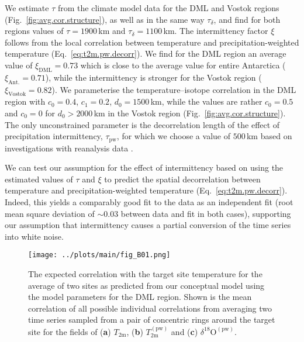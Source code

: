 \documentclass[cp, manuscript]{copernicus}
\begin{document}
We estimate $\tau$ from the climate model data for the DML and Vostok regions
(Fig.~\ref{fig:avg.cor.structure}), as well as in the same way
$\tau_{\delta}$, and find for both regions values of $\tau=1900$\,km and
$\tau_{\delta}=1100$\,km. The intermittency factor $\xi$ follows from the
local correlation between temperature and precipitation-weighted temperature
(Eq.~\ref{eq:t2m.pw.decorr}). We find for the DML region an average value of
$\xi_{\mathrm{DML}}=0.73$ which is close to the average value for entire
Antarctica ($\xi_{\mathrm{Ant.}}=0.71$), while the intermittency is stronger for
the Vostok region ($\xi_{\mathrm{Vostok}}=0.82$). We parameterise the
temperature--isotope correlation in the DML region with $c_0=0.4$, $c_1=0.2$,
$d_0=1500$\,km, while the values are rather $c_0=0.5$ and $c_0=0$ for
$d_0>2000$\,km in the Vostok region (Fig.~\ref{fig:avg.cor.structure}). The only
unconstrained parameter is the decorrelation length of the effect of
precipitation intermittency, $\tau_{\mathrm{pw}}$, for which we choose a value
of $500$\,km based on investigations with reanalysis data \citep{Munch2018a}.

We can test our assumption for the effect of intermittency based on using the
estimated values of $\tau$ and $\xi$ to predict the spatial decorrelation
between temperature and precipitation-weighted temperature
(Eq.~\ref{eq:t2m.pw.decorr}). Indeed, this yields a comparably good fit to the
data as an independent fit (root mean square deviation of $\sim0.03$ between
data and fit in both cases), supporting our assumption that intermittency causes
a partial conversion of the time series into white noise.

\begin{figure*}[t]%
\centering
\texttt{[image: ../plots/main/fig\_B01.png]}
\caption{%
  The expected correlation with the target site temperature for the average of
  two sites as predicted from our conceptual model using the model parameters
  for the DML region. Shown is the mean correlation of all possible individual
  correlations from averaging two time series sampled from a pair of concentric
  rings around the target site for the fields of (\textbf{a}) $T_{\mathrm{2m}}$,
  (\textbf{b}) $T_{\mathrm{2m}}^{\mathrm{(pw)}}$ and (\textbf{c})
  $\delta^{18}\mathrm{O}^{\mathrm{(pw)}}$.}
\label{fig:conceptual.model}%
\end{figure*}%
\end{document}
